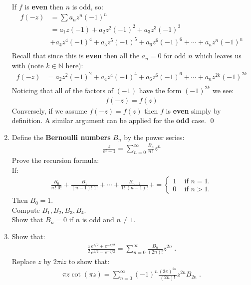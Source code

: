 \begin{enumerate}
  If $f$ is \textbf{even} then $n$ is odd, so:
  \begin{align*}
    f(-z) &= \sum a_n z^n (-1)^n \\
    &= a_1 z (-1) + a_2 z^2 (-1)^2 + a_3 z^3 (-1)^3 \\ 
    &+ a_4 z^4 (-1)^4 + a_5 z^5 (-1)^5 + a_6 z^6 (-1)^6 + \cdots + a_n z^n (-1)^n \\
  \end{align*}
  Recall that since this is \textbf{even} then all the $a_n = 0$ for odd $n$ which leaves us with (note $k \in \mathbb{N}$ here):
  \begin{align*}
    f(-z) &= a_2 z^2 (-1)^2 + a_4 z^4 (-1)^4 + a_6 z^6 (-1)^6 + \cdots + a_n z^{2k} (-1)^{2k} \\
  \end{align*} 
  Noticing that all of the factors of $(-1)$ have the form $(-1)^{2k}$ we see:
  \begin{align*}
    f(-z) = f(z)
  \end{align*}
  Conversely, if we assume $f(-z) = f(z)$ then $f$ is \textbf{even} simply by definition. 
  A similar argument can be applied for the \textbf{odd} case.
  \qed

  \item Define the \textbf{Bernoulli numbers} $B_n$ by the power series:
  \begin{align*}
    \frac{z}{e^z - 1} = \sum_{n = 0}^{\infty}\frac{B_n}{n\,!}z^n
  \end{align*}
  Prove the recursion formula: \\

  If:
  \begin{align*}
    \frac{B_0}{n \, ! \; 0!} + \frac{B_1}{(n - 1)! \; 1!} + \cdots + \frac{B_{n - 1}}{1! \; (n - 1)\,!} + = 
    \begin{cases}
      1 \;\;\; \text{   if } n = 1. \\
      0 \;\;\; \text{   if } n > 1.
    \end{cases}
  \end{align*}
  Then $B_0 = 1.$ \\
  
  Compute $B_1, B_2, B_3, B_4.$ \\ 
  
  Show that $B_n = 0$ if $n$ is odd and $n \not = 1.$
  
  \item Show that:
  \begin{align*}
    \frac{z}{2} \frac{e^{z/2} + e^{-z/2}}{e^{z/2} - e^{-z/2}} = \sum_{n = 0}^\infty \frac{B_n}{(2n)!}z^{2n} \;.
  \end{align*}
  Replace $z$ by $2\pi i z$ to show that:
  \begin{align*}
    \pi z \cot(\pi z) = \sum_{n = 0}^\infty (-1)^n \frac{(2\pi)^{2n}}{(2n)!} z^{2n} B_{2n} \;.
  \end{align*}


\end{enumerate}
